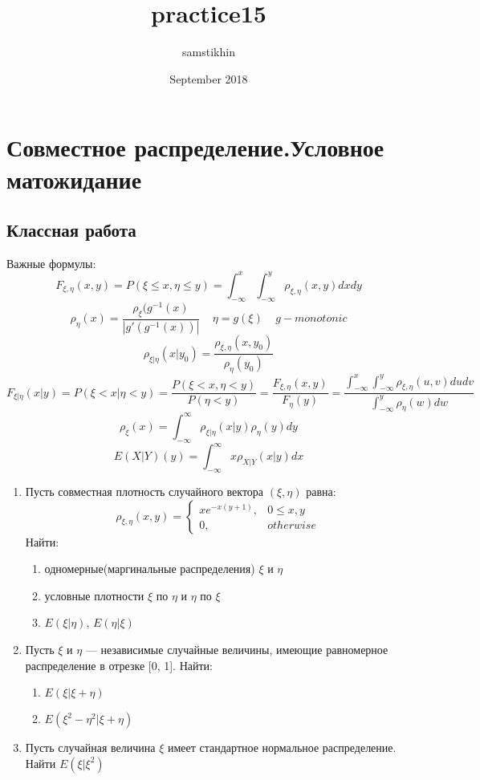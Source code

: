 \documentclass[a4paper, 14pt]{extarticle}
\title{practice15}
\author{samstikhin}
\date{September 2018}
\begin{document}
\section*{Совместное распределение.Условное матожидание}
\subsection*{Классная работа}
Важные формулы:
$$F_{\xi,\eta}(x,y) = P(\xi \leq x, \eta \leq y) = \int_{-\infty}^{x}\int_{-\infty}^{y}\rho_{\xi,\eta}(x,y)dxdy$$
$$\rho_{\eta}(x) = \frac{\rho_{\xi}(g^{-1}(x)}{|g'(g^{-1}(x))|}~~~~~\eta = g(\xi)~~~~~g - monotonic$$
$$\rho_{\xi|\eta}(x|y_0) = \frac{\rho_{\xi,\eta}(x, y_0)}{\rho_{\eta}(y_0)}$$
$$F_{\xi|\eta}(x|y) = P(\xi<x|\eta<y) = \frac{P(\xi<x, \eta<y)}{P(\eta<y)} = \frac{F_{\xi,\eta}(x,y)}{F_\eta(y)} = 
\frac{\int_{-\infty}^{x}\int_{-\infty}^{y}\rho_{\xi,\eta}(u,v)dudv}{\int_{-\infty}^{y}\rho_{\eta}(w)dw}$$
$$\rho_{\xi}(x) = \int_{-\infty}^{\infty} \rho_{\xi|\eta}(x|y)\rho_{\eta}(y)dy$$
$$E(X|Y)(y) = \int_{-\infty}^{\infty}x\rho_{X|Y}(x|y)dx$$
\begin{enumerate}
\item Пусть совместная плотность случайного вектора $(\xi, \eta)$ равна:
$$\rho_{\xi,\eta}(x,y) =\left\{
	\begin{array}{cc}
	xe^{-x(y+1)}, & 0\leq x,y\\
	0, & otherwise
	\end{array}\right.$$
Найти:
\begin{enumerate}
\item одномерные(маргинальные распределения) $\xi$ и $\eta$
\item условные плотности $\xi$ по $\eta$ и $\eta$ по $\xi$
\item $E(\xi|\eta)$, $E(\eta|\xi)$
\end{enumerate}

\item Пусть $\xi$ и $\eta$ — независимые случайные величины, имеющие
равномерное распределение в отрезке [0, 1]. Найти:
\begin{enumerate}
\item $E(\xi|\xi + \eta)$
\item $E(\xi^2 - \eta^2 |\xi + \eta)$
\end{enumerate}

\item Пусть случайная величина $\xi$ имеет стандартное нормальное
распределение. Найти $E(\xi|\xi^2)$
\end{enumerate}
\newpage
\end{document}
